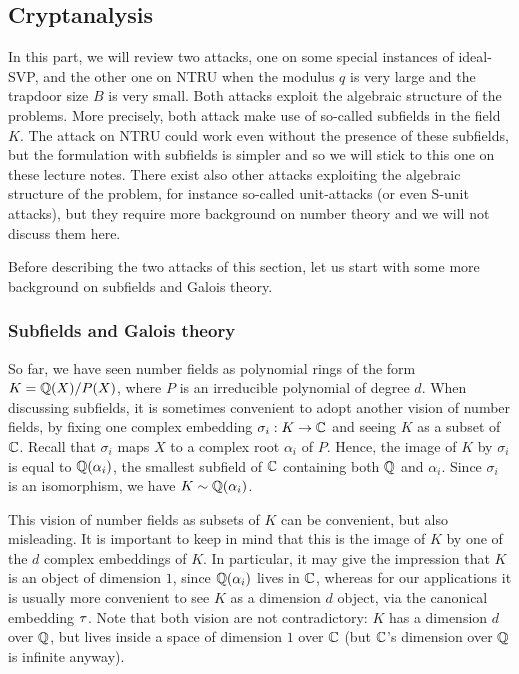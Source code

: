 \subsection{Cryptanalysis}
\label{sec:cryptanalysis}

In this part, we will review two attacks, one on some special instances of ideal-SVP, and the other one on NTRU when the modulus $q$ is very large and the trapdoor size $B$ is very small. Both attacks exploit the algebraic structure of the problems. More precisely, both attack make use of so-called subfields in the field $K$. The attack on NTRU could work even without the presence of these subfields, but the formulation with subfields is simpler and so we will stick to this one on these lecture notes.
There exist also other attacks exploiting the algebraic structure of the problem, for instance so-called unit-attacks (or even S-unit attacks), but they require more background on number theory and we will not discuss them here.

Before describing the two attacks of this section, let us start with some more background on subfields and Galois theory.

\subsubsection{Subfields and Galois theory}

So far, we have seen number fields as polynomial rings of the form $K = \mathbb{Q}(X)/P(X)$, where $P$ is an irreducible polynomial of degree $d$. When discussing subfields, it is sometimes convenient to adopt another vision of number fields, by fixing one complex embedding $\sigma_i: K \rightarrow \mathbb{C}$ and seeing $K$ as a subset of $\mathbb{C}$. Recall that $\sigma_i$ maps $X$ to a complex root $\alpha_i$ of $P$. Hence, the image of $K$ by $\sigma_i$ is equal to $\mathbb{Q}(\alpha_i)$, the smallest subfield of $\mathbb{C}$ containing both $\mathbb{Q}$ and $\alpha_i$. Since $\sigma_i$ is an isomorphism, we have $K \sim \mathbb{Q}(\alpha_i)$.

This vision of number fields as subsets of $K$ can be convenient, but also misleading. It is important to keep in mind that this is the image of $K$ by one of the $d$ complex embeddings of $K$. In particular, it may give the impression that $K$ is an object of dimension $1$, since $\mathbb{Q}(\alpha_i)$ lives in $\mathbb{C}$, whereas for our applications it is usually more convenient to see $K$ as a dimension $d$ object, via the canonical embedding $\tau$. Note that both vision are not contradictory: $K$ has a dimension $d$ over $\mathbb{Q}$, but lives inside a space of dimension $1$ over $\mathbb{C}$ (but $\mathbb{C}$'s dimension over $\mathbb{Q}$ is infinite anyway).

